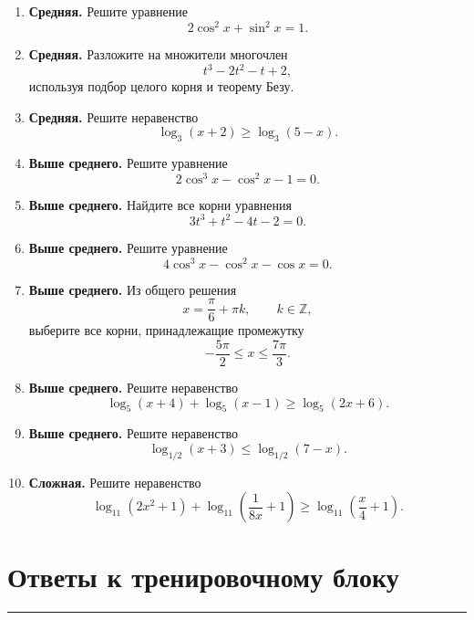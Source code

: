 \documentclass[a4paper,12pt]{article}
\newcommand{\sectionline}{%
    \vspace{0.2em}
    \noindent\color{linegray}\rule{\linewidth}{0.6pt}
    \vspace{0.4em}
}
\begin{document}
\begin{enumerate}

    \item \textbf{Средняя.}
    Решите уравнение
    \[
    2\cos^2x+\sin^2x=1.
    \]

    \item \textbf{Средняя.}
    Разложите на множители многочлен
    \[
    t^3-2t^2-t+2,
    \]
    используя подбор целого корня и теорему Безу.

    \item \textbf{Средняя.}
    Решите неравенство
    \[
    \log_3(x+2)\ge\log_3(5-x).
    \]

    \item \textbf{Выше среднего.}
    Решите уравнение
    \[
    2\cos^3x-\cos^2x-1=0.
    \]

    \item \textbf{Выше среднего.}
    Найдите все корни уравнения
    \[
    3t^3+t^2-4t-2=0.
    \]

    \item \textbf{Выше среднего.}
    Решите уравнение
    \[
    4\cos^3x-\cos^2x-\cos x=0.
    \]

    \item \textbf{Выше среднего.}
    Из общего решения
    \[
    x=\frac{\pi}{6}+\pi k,
    \qquad k\in\mathbb Z,
    \]
    выберите все корни, принадлежащие промежутку
    \[
    -\frac{5\pi}{2}\le x\le\frac{7\pi}{3}.
    \]

    \item \textbf{Выше среднего.}
    Решите неравенство
    \[
    \log_5(x+4)+\log_5(x-1)
    \ge
    \log_5(2x+6).
    \]

    \item \textbf{Выше среднего.}
    Решите неравенство
    \[
    \log_{1/2}(x+3)
    \le
    \log_{1/2}(7-x).
    \]

    \item \textbf{Сложная.}
    Решите неравенство
    \[
    \log_{11}(2x^2+1)
    +
    \log_{11}\left(\frac1{8x}+1\right)
    \ge
    \log_{11}\left(\frac{x}{4}+1\right).
    \]

\end{enumerate}

\clearpage

\section*{\color{darkaccent}Ответы к тренировочному блоку}
\sectionline
\end{document}

